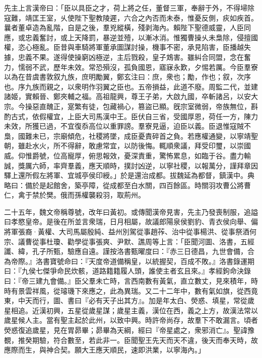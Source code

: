 \begin{pinyinscope}
先主上言漢帝曰：「臣以具臣之才，荷上將之任，董督三軍，奉辭于外，不得埽除寇難，靖匡王室，乆使陛下聖教陵遲，六合之內否而未泰，惟憂反側，疢如疾首。曩者董卓造為亂階，自是之後，羣兇縱橫，殘剥海內。賴陛下聖德威靈，人臣同應，或忠義奮討，或上天降罰，暴逆並殪，以漸冰消。惟獨曹操乆未梟除，侵擅國權，恣心極亂。臣昔與車騎將軍董承圖謀討操，機事不密，承見陷害，臣播越失據，忠義不果。遂得使操窮凶極逆，主后戮殺，皇子鴆害。雖糾合同盟，念在奮力，懦弱不武，歷年未效。常恐殞沒，孤負國恩，寤寐永歎，夕惕若厲。今臣羣寮以為在昔虞書敦叙九族，庶明勵翼，鄭玄注曰：庶，衆也；勵，作也；叙，次序也。序九族而親之，以衆明作羽翼之臣也。五帝損益，此道不廢。周監二代，並建諸姬，實賴晉、鄭夾輔之福。高祖龍興，尊王子弟，大啟九國，卒斬諸呂，以安大宗。今操惡直醜正，寔繁有徒，包藏禍心，篡盜已顯。旣宗室微弱，帝族無位，斟酌古式，依假權宜，上臣大司馬漢中王。臣伏自三省，受國厚恩，荷任一方，陳力未效，所獲已過，不宜復忝高位以重罪謗。羣寮見逼，迫臣以義。臣退惟寇賊不梟，國難未已，宗廟傾危，社稷將墜，成臣憂責碎首之負。若應權通變，以寧靖聖朝，雖赴水火，所不得辭，敢慮常宜，以防後悔。輒順衆議，拜受印璽，以崇國威。仰惟爵號，位高寵厚，俯思報效，憂深責重，驚怖累息，如臨于谷。盡力輸誠，獎厲六師，率齊羣義，應天順時，撲討凶逆，以寧社稷，以報萬分，謹拜章因驛上還所假左將軍、宜城亭侯印綬。」於是還治成都。拔魏延為都督，鎮漢中。典略曰：備於是起館舍，築亭障，從成都至白水關，四百餘區。時關羽攻曹公將曹仁，禽于禁於樊。俄而孫權襲殺羽，取荊州。

二十五年，魏文帝稱尊號，改年曰黃初。或傳聞漢帝見害，先主乃發喪制服，追謚曰孝愍皇帝。是後在所並言衆瑞，日月相屬，故議郎陽泉侯劉豹、青衣侯向舉、偏將軍張裔·黃權、大司馬屬殷純、益州別駕從事趙莋、治中從事楊洪、從事祭酒何宗、議曹從事杜瓊、勸學從事張爽、尹默、譙周等上言：「臣聞河圖、洛書，五經讖、緯，孔子所甄，驗應自遠。謹按洛書甄曜度曰：『赤三日德昌，九世會備，合為帝際。』洛書寶號命曰：『天度帝道備稱皇，以統握契，百成不敗。』洛書錄運期曰：『九侯七傑爭命民炊骸，道路籍籍履人頭，誰使主者玄且來。』孝經鉤命決錄曰：『帝三建九會備。』臣父羣未亡時，言西南數有黃氣，直立數丈，見來積年，時時有景雲祥風，從璿璣下來應之，此為異瑞。又二十二年中，數有氣如旗，從西竟東，中天而行，圖、書曰『必有天子出其方』。加是年太白、熒惑、填星，常從歲星相追。近漢初興，五星從歲星謀；歲星主義，漢位在西，義之上方，故漢法常以歲星候人主。當有聖主起於此州，以致中興。時許帝尚存，故羣下不敢漏言。頃者熒惑復追歲星，見在胃昴畢；昴畢為天綱，經曰『帝星處之，衆邪消亡』。聖諱豫覩，推癸期驗，符合數至，若此非一。臣聞聖王先天而天不違，後天而奉天時，故應際而生，與神合契。願大王應天順民，速即洪業，以寧海內。」


\end{pinyinscope}
